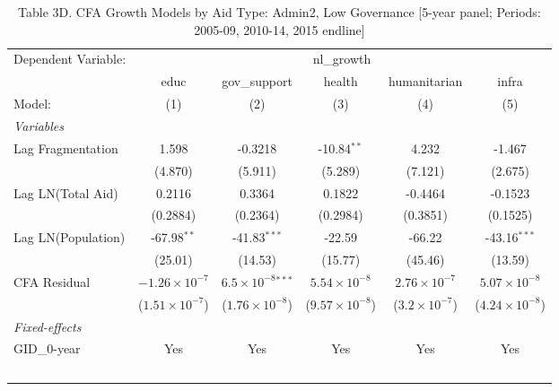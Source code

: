 
\begin{table}[H]
   \caption{Table 3D. CFA Growth Models by Aid Type: Admin2, Low Governance [5-year panel; Periods: 2005-09, 2010-14, 2015 endline]}
   \centering
   \begin{tabular}{lccccc}
      \tabularnewline \midrule \midrule
      Dependent Variable: & \multicolumn{5}{c}{nl\_growth}\\
                         & educ                    & gov\_support                 & health                  & humanitarian           & infra \\   
      Model:             & (1)                     & (2)                          & (3)                     & (4)                    & (5)\\  
      \midrule
      \emph{Variables}\\
      Lag Fragmentation  & 1.598                   & -0.3218                      & -10.84$^{**}$           & 4.232                  & -1.467\\   
                         & (4.870)                 & (5.911)                      & (5.289)                 & (7.121)                & (2.675)\\   
      Lag LN(Total Aid)  & 0.2116                  & 0.3364                       & 0.1822                  & -0.4464                & -0.1523\\   
                         & (0.2884)                & (0.2364)                     & (0.2984)                & (0.3851)               & (0.1525)\\   
      Lag LN(Population) & -67.98$^{**}$           & -41.83$^{***}$               & -22.59                  & -66.22                 & -43.16$^{***}$\\   
                         & (25.01)                 & (14.53)                      & (15.77)                 & (45.46)                & (13.59)\\   
      CFA Residual       & $-1.26\times 10^{-7}$   & $6.5\times 10^{-8}$$^{***}$  & $5.54\times 10^{-8}$    & $2.76\times 10^{-7}$   & $5.07\times 10^{-8}$\\    
                         & ($1.51\times 10^{-7}$)  & ($1.76\times 10^{-8}$)       & ($9.57\times 10^{-8}$)  & ($3.2\times 10^{-7}$)  & ($4.24\times 10^{-8}$)\\    
      \midrule
      \emph{Fixed-effects}\\
      GID\_0-year        & Yes                     & Yes                          & Yes                     & Yes                    & Yes\\  
$$
\end{tabular}
\end{table}
